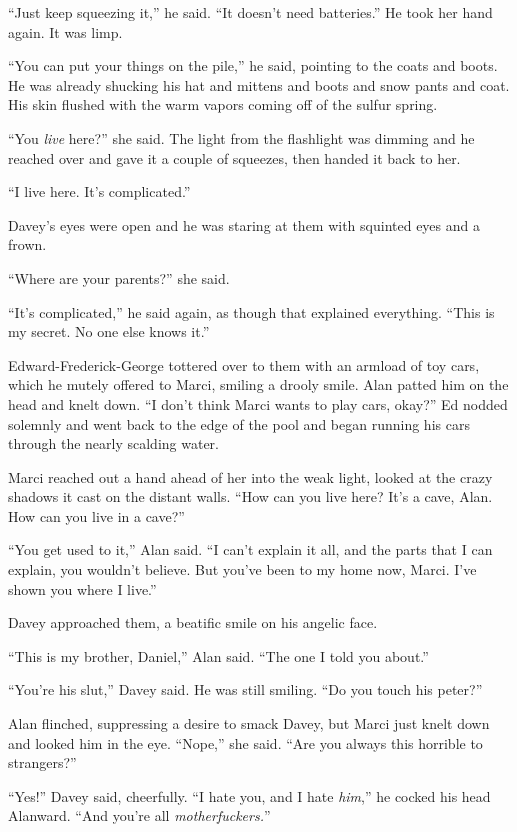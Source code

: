 \documentclass{article}
\begin{document}
``Just keep squeezing it,'' he said.  ``It doesn't need batteries.''
He took her hand again.  It was limp.

``You can put your things on the pile,'' he said, pointing to the
coats and boots.  He was already shucking his hat and mittens and
boots and snow pants and coat.  His skin flushed with the warm vapors
coming off of the sulfur spring.

``You \textit{live} here?'' she said.  The light from the flashlight
was dimming and he reached over and gave it a couple of squeezes, then
handed it back to her.

``I live here.  It's complicated.''

Davey's eyes were open and he was staring at them with squinted eyes
and a frown.

``Where are your parents?'' she said.

``It's complicated,'' he said again, as though that explained
everything.  ``This is my secret.  No one else knows it.''

Edward-Frederick-George tottered over to them with an armload of toy
cars, which he mutely offered to Marci, smiling a drooly smile.  Alan
patted him on the head and knelt down.  ``I don't think Marci wants to
play cars, okay?'' Ed nodded solemnly and went back to the edge of the
pool and began running his cars through the nearly scalding water.

Marci reached out a hand ahead of her into the weak light, looked at
the crazy shadows it cast on the distant walls.  ``How can you live
here?  It's a cave, Alan.  How can you live in a cave?''

``You get used to it,'' Alan said.  ``I can't explain it all, and the
parts that I can explain, you wouldn't believe.  But you've been to my
home now, Marci.  I've shown you where I live.''

Davey approached them, a beatific smile on his angelic face.

``This is my brother, Daniel,'' Alan said.  ``The one I told you
about.''

``You're his slut,'' Davey said.  He was still smiling.  ``Do you
touch his peter?''

Alan flinched, suppressing a desire to smack Davey, but Marci just
knelt down and looked him in the eye.  ``Nope,'' she said.  ``Are you
always this horrible to strangers?''

``Yes!'' Davey said, cheerfully.  ``I hate you, and I hate
\textit{him},'' he cocked his head Alanward.  ``And you're all
\textit{motherfuckers.}''
\end{document}
